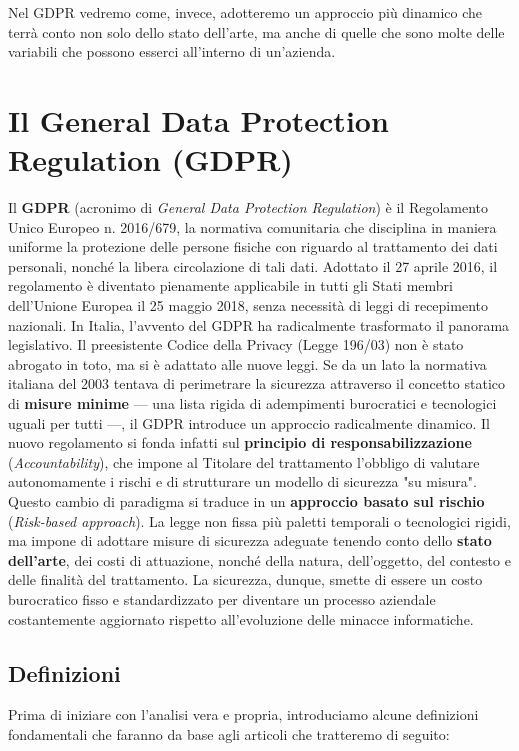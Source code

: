 Nel GDPR vedremo come, invece, adotteremo un approccio più dinamico che terrà conto non solo dello stato dell'arte, ma anche di quelle che sono molte delle variabili che possono esserci all'interno di un'azienda.
\section{Il General Data Protection Regulation (GDPR)}

Il \textbf{GDPR} (acronimo di \textit{General Data Protection Regulation}) è il Regolamento Unico Europeo n. 2016/679, la normativa comunitaria che disciplina in maniera uniforme la protezione delle persone fisiche con riguardo al trattamento dei dati personali, nonché la libera circolazione di tali dati.
Adottato il 27 aprile 2016, il regolamento è diventato pienamente applicabile in tutti gli Stati membri dell'Unione Europea il 25 maggio 2018, senza necessità di leggi di recepimento nazionali.
In Italia, l'avvento del GDPR ha radicalmente trasformato il panorama legislativo.
Il preesistente Codice della Privacy (Legge 196/03) non è stato abrogato in toto, ma si è adattato alle nuove leggi.
Se da un lato la normativa italiana del 2003 tentava di perimetrare la sicurezza attraverso il concetto statico di \textbf{misure minime} — una lista rigida di adempimenti burocratici e tecnologici uguali per tutti —, il GDPR introduce un approccio radicalmente dinamico.
Il nuovo regolamento si fonda infatti sul \textbf{principio di responsabilizzazione} (\textit{Accountability}), che impone al Titolare del trattamento l'obbligo di valutare autonomamente i rischi e di strutturare un modello di sicurezza "su misura".
Questo cambio di paradigma si traduce in un \textbf{approccio basato sul rischio} (\textit{Risk-based approach}).
La legge non fissa più paletti temporali o tecnologici rigidi, ma impone di adottare misure di sicurezza adeguate tenendo conto dello \textbf{stato dell'arte}, dei costi di attuazione, nonché della natura, dell'oggetto, del contesto e delle finalità del trattamento.
La sicurezza, dunque, smette di essere un costo burocratico fisso e standardizzato per diventare un processo aziendale costantemente aggiornato rispetto all'evoluzione delle minacce informatiche.
\subsection{Definizioni}
Prima di iniziare con l'analisi vera e propria, introduciamo alcune definizioni fondamentali che faranno da base agli articoli che tratteremo di seguito:

